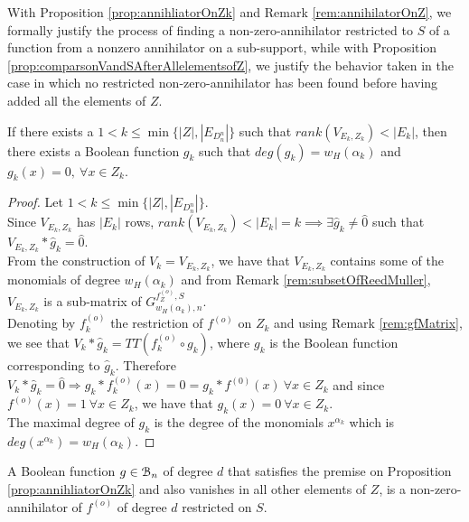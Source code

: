 \documentclass[11pt]{llncs}
\begin{document}
With Proposition \ref{prop:annihliatorOnZk} and Remark \ref{rem:annihilatorOnZ}, we formally justify the process of finding a non-zero-annihilator restricted to $S$ of a function from a nonzero annihilator on a sub-support, while with Proposition \ref{prop:comparsonVandSAfterAllelementsofZ}, we justify the behavior taken in the case in which no restricted non-zero-annihilator has been found before having added all the elements of $Z$.
\begin{proposition}\label{prop:annihliatorOnZk}
    If there exists a $1 < k \leq \min\{|Z|, |E_{D_n^n}|\}$ such that $rank(V_{E_k,Z_k}) < |E_k|$, then there exists a Boolean function $g_k$ such that $deg\left(g_k\right) = w_H(\alpha_k)$ and $g_k(x) = 0,\ \forall x \in Z_k$.
\end{proposition}
\begin{proof}
    Let $1 < k \leq \min\{|Z|, |E_{D_n^n}|\}$.\\
    Since $V_{E_k, Z_k}$ has $|E_k|$ rows, $rank(V_{E_k, Z_k}) < |E_k| = k \implies \exists \hat{g}_k \neq \hat{0}$ such that $V_{E_k, Z_k}*\hat{g}_k = \hat{0}$.\\
    From the construction of $V_k = V_{E_k, Z_k}$, we have that $V_{E_k, Z_k}$ contains some of the monomials of degree $w_H\left(\alpha_{k}\right)$ and from Remark \ref{rem:subsetOfReedMuller}, $V_{E_k,Z_k}$ is a sub-matrix of $G_{w_H\left(\alpha_k\right),n}^{f_Z^{(o)}, S}$.\\
    Denoting by $f_k^{(o)}$ the restriction of $f^{(o)}$ on $Z_k$ and using Remark \ref{rem:gfMatrix}, we see that $V_k * \hat{g}_k= TT\left(f_k^{(o)}\circ g_k\right)$, where $g_k$ is the Boolean function corresponding to $\hat{g}_k$. Therefore $V_k * \hat{g}_k = \hat{0} \Rightarrow g_k * f_k^{(o)} (x) = 0 = g_k * f^{(0)} (x)\ \forall x\in Z_k$ and since $f^{(o)} (x) = 1\ \forall x\in Z_k$, we have that $g_k(x) = 0\ \forall x \in Z_k$.\\
    The maximal degree of $g_k$ is the degree of the monomials $x^{\alpha_k}$ which is $deg(x^{\alpha_k}) = w_H(\alpha_k)$.
\end{proof}

\begin{remark}\label{rem:annihilatorOnZ}
    A Boolean function $g \in \mathcal{B}_{n}$ of degree $d$ that satisfies the premise on Proposition \ref{prop:annihliatorOnZk} and also vanishes in all other elements of $Z$, is a non-zero-annihilator of $f^{(o)}$ of degree $d$ restricted on $S$.
\end{remark}
    
\end{document}
